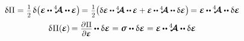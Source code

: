 \nopagebreak\vspace{.1em}\begin{equation*}
\begin{gathered}
\variation{\potential}
= \hspace{.1ex} \smash{\smalldisplaystyleonehalf} \hspace{.25ex} \variation{ \bigl( \infinitesimaldeformation \hspace{-0.1ex} \dotdotp \hspace{-0.1ex} \stiffnesstensor \dotdotp \hspace{-0.1ex} \infinitesimaldeformation \bigr) } \hspace{-0.25ex}
= \hspace{.1ex} \smash{\smalldisplaystyleonehalf} \hspace{-0.1ex} \bigl( \scalebox{0.95}{$ \variation{\infinitesimaldeformation} \hspace{-0.1ex} \dotdotp \hspace{-0.1ex} \stiffnesstensor \dotdotp \hspace{-0.1ex} \infinitesimaldeformation + \infinitesimaldeformation \hspace{-0.1ex} \dotdotp \hspace{-0.1ex} \stiffnesstensor \dotdotp \variation{\infinitesimaldeformation} $} \bigr) \hspace{-0.25ex}
= \tikzmark{beginLinearStressAsDeformationAndStiffness} \infinitesimaldeformation \hspace{-0.1ex} \dotdotp \hspace{-0.1ex} \stiffnesstensor \tikzmark{endLinearStressAsDeformationAndStiffness} \dotdotp \variation{\infinitesimaldeformation}
\\[.3em]
%
\variation{\hspace{.1ex}\potential}(\hspace{-0.1ex}\infinitesimaldeformation\hspace{-0.1ex}) \hspace{-0.2ex}
= \scalebox{0.9}{$ \displaystyle\frac{\raisemath{-0.16em}{\partial\hspace{.1ex} \potential}}{\partial \infinitesimaldeformation}$} \hspace{-0.1ex} \dotdotp \variation{\infinitesimaldeformation}
= \linearstress \dotdotp \variation{\infinitesimaldeformation}
= \infinitesimaldeformation \hspace{-0.1ex} \dotdotp \hspace{-0.1ex} \stiffnesstensor \dotdotp \variation{\infinitesimaldeformation}
\\

\end{gathered}
\end{equation*}
